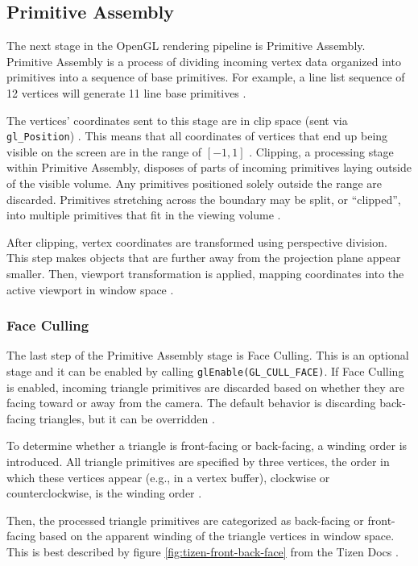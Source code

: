 \documentclass[
  digital,     %
  oneside,     %
  nosansbold,  %
  nocolorbold, %
  lof,         %
  lot,         %
]{fithesis4}
\begin{document}
\subsection{Primitive Assembly}
The next stage in the OpenGL rendering pipeline is Primitive Assembly.
Primitive Assembly is a process of dividing incoming vertex data organized into primitives into a sequence
of base primitives. For example, a line list sequence of 12 vertices will generate 11 line base primitives
\cite{openglwiki-primitive-assembly}.

The vertices' coordinates sent to this stage are in clip space (sent via \verb|gl_Position|) \cite{openglwiki-vertex-post-processing}.
This means that all coordinates of vertices that end up being visible on the screen are in the range of $[-1,1]$
\cite{learnopengl-coord-systems}. Clipping, a processing stage within Primitive Assembly, disposes of
parts of incoming primitives laying outside of the visible volume. Any primitives positioned solely outside the range
are discarded. Primitives stretching across the boundary may be split, or \enquote{clipped}, into multiple primitives
that fit in the viewing volume \cite[p.12]{opengl-book}.

After clipping, vertex coordinates are transformed using perspective division. This step makes objects that are
further away from the projection plane appear smaller. Then, viewport transformation is applied, mapping coordinates
into the active viewport in window space \cite[p.12]{opengl-book}.

\subsubsection{Face Culling}
The last step of the Primitive Assembly stage is Face Culling. This is an optional stage and
it can be enabled by calling \verb|glEnable(GL_CULL_FACE)|.
If Face Culling is enabled, incoming triangle primitives are discarded based on whether they are facing toward or away from the camera.
The default behavior is discarding back-facing triangles, but it can be overridden \cite{openglwiki-face-culling}.

To determine whether a triangle is front-facing or back-facing, a winding order is introduced. All triangle primitives
are specified by three vertices, the order in which these vertices appear (e.g., in a vertex buffer),
clockwise or counterclockwise, is the winding order \cite{openglwiki-face-culling}\cite{tizen-face-culling}.

Then, the processed triangle primitives are categorized as back-facing or front-facing based on the apparent
winding of the triangle vertices in window space. This is best described by figure \ref{fig:tizen-front-back-face}
from the Tizen Docs \cite{tizen-face-culling}.
\end{document}
